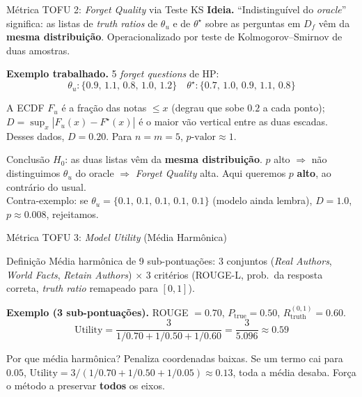 \documentclass[aspectratio=169,xcolor=dvipsnames]{beamer}
\begin{document}
  \begin{frame}{Métrica TOFU 2: \textit{Forget Quality} via Teste KS}
    \textbf{Ideia.} ``Indistinguível do \textit{oracle}'' significa: as listas de \textit{truth ratios} de $\theta_u$ e de $\theta^\star$ sobre as perguntas em $D_f$ vêm da \textbf{mesma distribuição}. Operacionalizado por teste de Kolmogorov--Smirnov de duas amostras.

    \vspace{0.4em}
    \textbf{Exemplo trabalhado.} 5 \textit{forget questions} de HP:
    \[
      \theta_u: \{0.9,\, 1.1,\, 0.8,\, 1.0,\, 1.2\}
      \quad
      \theta^\star: \{0.7,\, 1.0,\, 0.9,\, 1.1,\, 0.8\}
    \]

    A ECDF $F_u$ é a fração das notas $\le x$ (degrau que sobe $0.2$ a cada ponto); $D = \sup_x |F_u(x) - F^\star(x)|$ é o maior vão vertical entre as duas escadas.\\
    Desses dados, $D = 0.20$. Para $n = m = 5$, $p\text{-valor} \approx 1$.

    \vspace{0.3em}
    \begin{block}{Conclusão}
      $H_0$: as duas listas vêm da \textbf{mesma distribuição}. $p$ alto $\Rightarrow$ não distinguimos $\theta_u$ do oracle $\Rightarrow$ \textit{Forget Quality} alta. Aqui queremos $p$ \textbf{alto}, ao contrário do usual.\\[0.2em]
      \footnotesize Contra-exemplo: se $\theta_u = \{0.1,\,0.1,\,0.1,\,0.1,\,0.1\}$ (modelo ainda lembra), $D = 1.0$, $p \approx 0.008$, rejeitamos.
    \end{block}
  \end{frame}

  \begin{frame}{Métrica TOFU 3: \textit{Model Utility} (Média Harmônica)}
    \begin{block}{Definição}
      Média harmônica de 9 sub-pontuações: 3 conjuntos (\textit{Real Authors}, \textit{World Facts}, \textit{Retain Authors}) $\times$ 3 critérios (ROUGE-L, prob.\ da resposta correta, \textit{truth ratio} remapeado para $[0,1]$).
    \end{block}

    \textbf{Exemplo (3 sub-pontuações).} ROUGE $= 0.70$, $P_{\text{true}} = 0.50$, $R_{\text{truth}}^{(0,1)} = 0.60$.
    \[
      \text{Utility} = \frac{3}{1/0.70 + 1/0.50 + 1/0.60}
                     = \frac{3}{5.096}
                     \approx \mathbf{0.59}
    \]

    \begin{block}{Por que média harmônica?}
      \footnotesize Penaliza coordenadas baixas. Se um termo cai para $0.05$, $\text{Utility} = 3/(1/0.70 + 1/0.50 + 1/0.05) \approx 0.13$, toda a média desaba. Força o método a preservar \textbf{todos} os eixos.
    \end{block}
  \end{frame}
\end{document}
